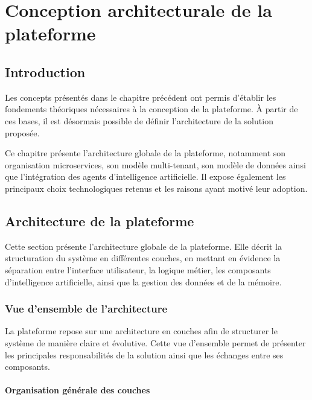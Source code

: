 
\chapter{Conception architecturale de la plateforme}

\minitoc

\newpage

\section{Introduction}

Les concepts présentés dans le chapitre précédent ont permis d'établir les fondements théoriques nécessaires à la conception de la plateforme. À partir de ces bases, il est désormais possible de définir l'architecture de la solution proposée.

Ce chapitre présente l'architecture globale de la plateforme, notamment son organisation microservices, son modèle multi-tenant, son modèle de données ainsi que l'intégration des agents d'intelligence artificielle. Il expose également les principaux choix technologiques retenus et les raisons ayant motivé leur adoption.

\section{Architecture de la plateforme}

Cette section présente l'architecture globale de la plateforme. Elle décrit la structuration du système en différentes couches, en mettant en évidence la séparation entre l'interface utilisateur, la logique métier, les composants d'intelligence artificielle, ainsi que la gestion des données et de la mémoire.

\subsection{Vue d'ensemble de l'architecture}

La plateforme repose sur une architecture en couches afin de structurer le système de manière
claire et évolutive. Cette vue d'ensemble permet de présenter les principales responsabilités de
la solution ainsi que les échanges entre ses composants.

\subsubsection{Organisation générale des couches}


